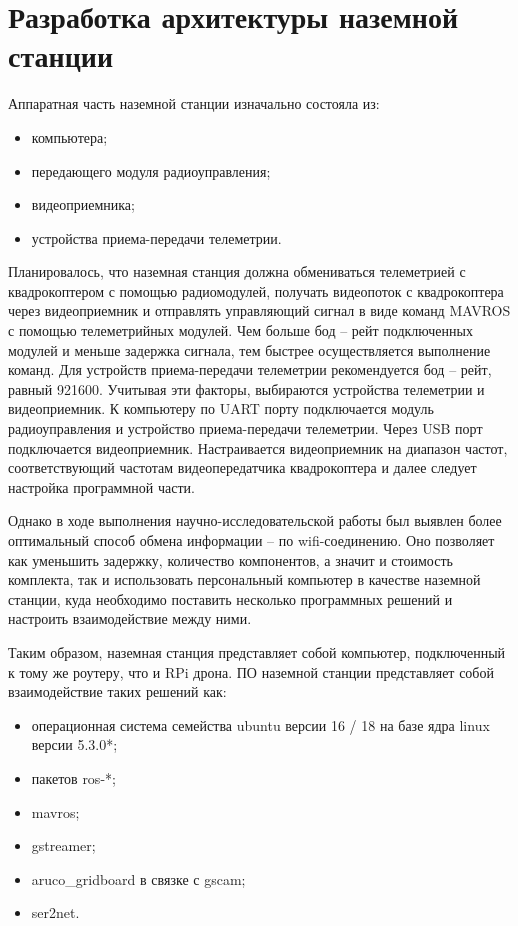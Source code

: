 \section{Разработка архитектуры наземной станции}
Аппаратная часть наземной станции изначально состояла из:
\begin{itemize}
	\item компьютера;
	\item передающего модуля радиоуправления;
	\item видеоприемника;
	\item устройства приема-передачи телеметрии.
\end{itemize}

Планировалось, что наземная станция должна обмениваться телеметрией с квадрокоптером с помощью радиомодулей, получать видеопоток с квадрокоптера через видеоприемник и отправлять управляющий сигнал в виде команд MAVROS с помощью телеметрийных модулей. Чем больше бод -- рейт подключенных модулей и меньше задержка сигнала, тем быстрее осуществляется выполнение команд. Для устройств приема-передачи телеметрии рекомендуется бод -- рейт, равный 921600. Учитывая эти факторы, выбираются устройства телеметрии и видеоприемник.
К компьютеру по UART порту подключается модуль радиоуправления и устройство приема-передачи телеметрии. Через USB порт подключается видеоприемник. Настраивается видеоприемник на диапазон частот, соответствующий частотам видеопередатчика квадрокоптера и далее следует настройка программной части.

Однако в ходе выполнения научно-исследовательской работы \cite{nir3} был выявлен более оптимальный способ обмена информации -- по wifi-соединению. Оно позволяет как уменьшить задержку, количество компонентов, а значит и стоимость комплекта, так и использовать персональный компьютер в качестве наземной станции, куда необходимо поставить несколько программных решений и настроить взаимодействие между ними.

Таким образом, наземная станция представляет собой компьютер, подключенный к тому же роутеру, что и RPi дрона.
ПО наземной станции представляет собой взаимодействие таких решений как:
\begin{itemize}
	\item операционная система семейства ubuntu версии 16 / 18 на базе ядра linux версии 5.3.0*;
	\item пакетов ros-*;
	\item mavros;
	\item gstreamer;
	\item aruco\_gridboard в связке с gscam;
	\item ser2net.
\end{itemize}

